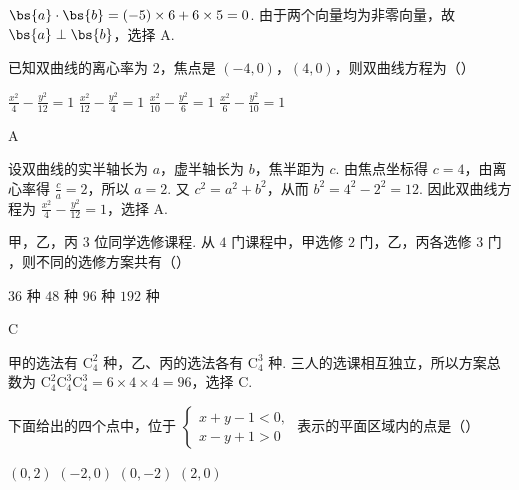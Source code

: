 \begin{solution}
\(\bs{a}\cdot\bs{b}=(-5)\times6+6\times5=0\). 由于两个向量均为非零向量，故 \(\bs{a}\perp\bs{b}\)，选择 A.
\end{solution}

\begin{problem}
已知双曲线的离心率为 \(2\)，焦点是 \((-4, 0)\)，\((4, 0)\)，则双曲线方程为（\quad）

\choices
    {\(\frac{x^2}{4} - \frac{y^2}{12} = 1\)}
    {\(\frac{x^2}{12} - \frac{y^2}{4} = 1\)}
    {\(\frac{x^2}{10} - \frac{y^2}{6} = 1\)}
    {\(\frac{x^2}{6} - \frac{y^2}{10} = 1\)}
\end{problem}

\begin{answer}
A
\end{answer}

\begin{solution}
设双曲线的实半轴长为 \(a\)，虚半轴长为 \(b\)，焦半距为 \(c\). 由焦点坐标得 \(c=4\)，由离心率得
\(\frac{c}{a}=2\)，所以 \(a=2\). 又 \(c^2=a^2+b^2\)，从而
\(b^2=4^2-2^2=12\). 因此双曲线方程为
\(\frac{x^2}{4}-\frac{y^2}{12}=1\)，选择 A.
\end{solution}

\begin{problem}
甲，乙，丙 \(3\text{ 位}\)同学选修课程. 从 \(4\text{ 门}\)课程中，甲选修 \(2\text{ 门}\)，乙，丙各选修 \(3\text{ 门}\)，则不同的选修方案共有（\quad）

\choices
    {\(36\text{ 种}\)}
    {\(48\text{ 种}\)}
    {\(96\text{ 种}\)}
    {\(192\text{ 种}\)}
\end{problem}

\begin{answer}
C
\end{answer}

\begin{solution}
甲的选法有 \(\mathrm C_4^2\) 种，乙、丙的选法各有 \(\mathrm C_4^3\) 种. 三人的选课相互独立，所以方案总数为
\(\mathrm C_4^2\mathrm C_4^3\mathrm C_4^3=6\times4\times4=96\)，选择 C.
\end{solution}

\begin{problem}
下面给出的四个点中，位于 \(\begin{cases}
x + y - 1 < 0,\\
x - y + 1 > 0
\end{cases}\) 表示的平面区域内的点是（\quad）

\choices
    {\((0,2)\)}
    {\((-2,0)\)}
    {\((0, -2)\)}
    {\((2,0)\)}
\end{problem}


